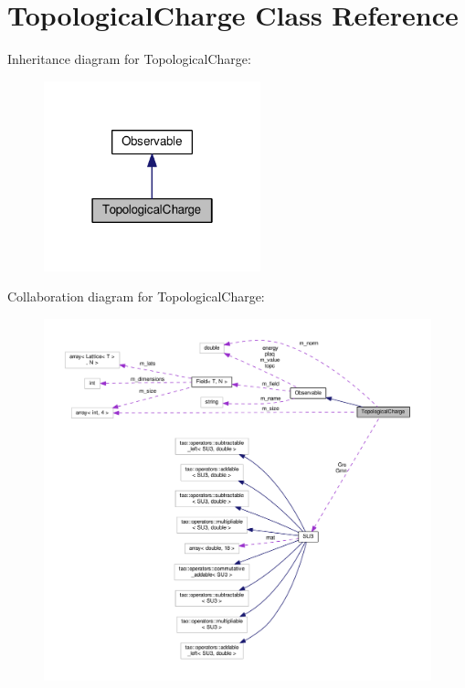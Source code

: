 \hypertarget{classTopologicalCharge}{}\section{Topological\+Charge Class Reference}
\label{classTopologicalCharge}


Inheritance diagram for Topological\+Charge\+:\nopagebreak
\begin{figure}[H]
\begin{center}
\leavevmode
\includegraphics[width=178pt]{d6/de5/classTopologicalCharge__inherit__graph}
\end{center}
\end{figure}


Collaboration diagram for Topological\+Charge\+:\nopagebreak
\begin{figure}[H]
\begin{center}
\leavevmode
\includegraphics[width=350pt]{d1/dab/classTopologicalCharge__coll__graph}
\end{center}
\end{figure}
